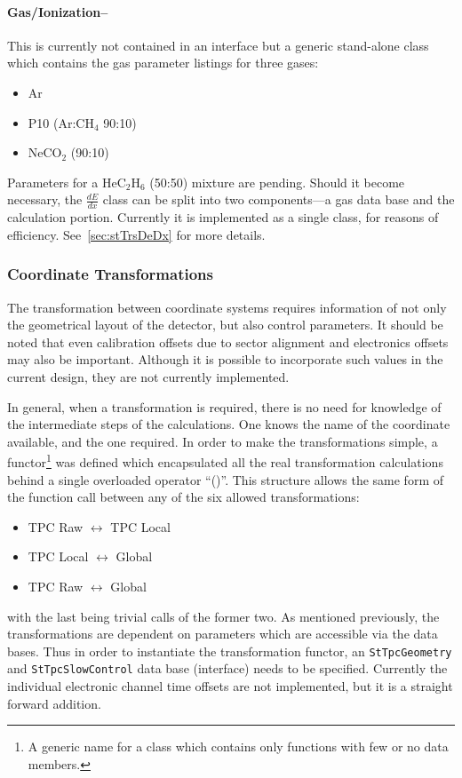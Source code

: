 \documentclass[twoside]{article}
\newcommand{\comp}[1]{\texttt{#1}}%
\begin{document}
\paragraph{Gas/Ionization--}

This is currently not contained in an interface but a generic
stand-alone class which contains the gas parameter listings for
three gases:
\begin{itemize}
  \item Ar
  \item P10 (Ar:CH$_{4}$ 90:10)
  \item NeCO$_{2}$ (90:10)
\end{itemize}
Parameters for a HeC$_{2}$H$_{6}$ (50:50) mixture are pending.
Should it become necessary,
the $\frac{dE}{dx}$ class can be split into two components---a 
gas data base and the calculation portion.  Currently it is implemented
as a single class, for reasons of efficiency.
See~\ref{sec:stTrsDeDx} for more details.

\subsubsection{Coordinate Transformations}

The transformation between coordinate systems requires information of not
only the geometrical layout of the detector, but also control parameters.
It should be noted that even calibration offsets due to sector alignment
and electronics offsets may also be important.  Although it is possible
to incorporate such values in the current design, they are not currently
implemented.

In general, when a transformation is required, there is no need 
for knowledge of the intermediate steps of the calculations.  One
knows the name of the coordinate available, and the one required.
In order to make the transformations simple, a 
functor\footnote{A generic name for a class which contains
  only functions with few or no data members.} 
was defined 
which encapsulated all the real transformation calculations behind
a single overloaded operator ``()''.  This structure allows the
same form of the function call between any of the six
allowed transformations:
\begin{itemize}
  \item TPC Raw $\leftrightarrow$ TPC Local
  \item TPC Local $\leftrightarrow$ Global
  \item TPC Raw $\leftrightarrow$ Global
\end{itemize}
with the last being trivial calls of the former two.
As mentioned previously, the transformations are dependent on
parameters which are accessible via the data bases.  Thus in
order to instantiate the transformation functor, an \comp{StTpcGeometry}
and \comp{StTpcSlowControl} data base (interface) needs to be specified.
Currently the
individual electronic channel time offsets are not implemented, but it
is a straight forward addition.
\end{document}

